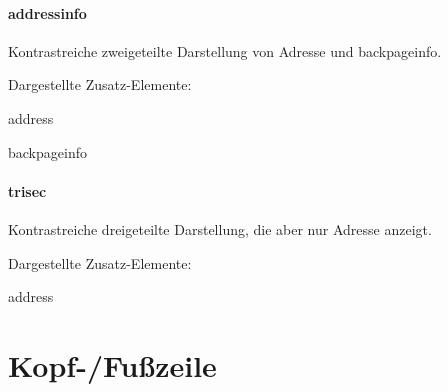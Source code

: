  \begin{minipage}[t]{0.33\textwidth}
    \null\centering\sffamily
  \end{minipage}
  \hfill
  \begin{minipage}[t]{0.6\textwidth}
    \paragraph{addressinfo}
    \par
    Kontrastreiche zweigeteilte Darstellung von Adresse und backpageinfo.
    \par\bigskip
    \par\bigskip
    Dargestellte Zusatz-Elemente:
    \begin{compactitem}\ttfamily
      \item address
      \item backpageinfo
    \end{compactitem}
  \end{minipage}

  \begin{minipage}[t]{0.33\textwidth}
    \null\centering\sffamily
  \end{minipage}
  \hfill
  \begin{minipage}[t]{0.6\textwidth}
    \paragraph{trisec}
    \par
    Kontrastreiche dreigeteilte Darstellung, die aber nur Adresse anzeigt.
    \par\bigskip
    \par\bigskip
    Dargestellte Zusatz-Elemente:
    \begin{compactitem}\ttfamily
      \item address
    \end{compactitem}
  \end{minipage}


\section{Kopf-/Fußzeile}\label{sec:headline}

